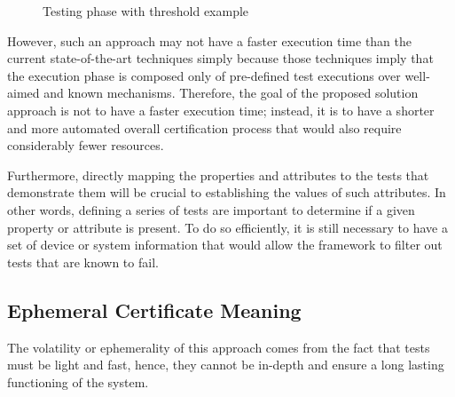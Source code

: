 \begin{figure}[htb]
    \centering
    \caption{Testing phase with threshold example}
    \label{fig:thex}
\end{figure}

However, such an approach may not have a faster execution time than the current state-of-the-art techniques simply because those techniques imply that the execution phase is composed only of pre-defined test executions over well-aimed and known mechanisms. Therefore, the goal of the proposed solution approach is not to have a faster execution time; instead, it is to have a shorter and more automated overall certification process that would also require considerably fewer resources.

Furthermore, directly mapping the properties and attributes to the tests that demonstrate them will be crucial to establishing the values of such attributes. In other words, defining a series of tests are important to determine if a given property or attribute is present. To do so efficiently, it is still necessary to have a set of device or system information that would allow the framework to filter out tests that are known to fail.



\subsection{Ephemeral Certificate Meaning}
The volatility or ephemerality of this approach comes from the fact that tests must be light and fast, hence, they cannot be in-depth and ensure a long lasting functioning of the system.
